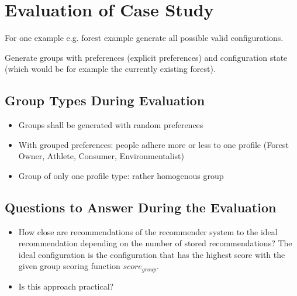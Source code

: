 \documentclass{article}
\begin{document}
    
\section{Evaluation of Case Study}

For one example e.g. forest example generate all possible valid configurations.

Generate groups with preferences (explicit preferences) and configuration state (which would be for example the currently existing forest).

\subsection{Group Types During Evaluation}
\begin{itemize}
    \item Groups shall be generated with random preferences
    \item With grouped preferences: people adhere more or less to one profile (Forest Owner, Athlete, Consumer, Environmentalist)
    \item Group of only one profile type: rather homogenous group
\end{itemize}

\subsection{Questions to Answer During the Evaluation}

\begin{itemize}
    \item How close are recommendations of the recommender system to the ideal recommendation depending on the number of stored recommendations? The ideal configuration is the configuration that has the highest score with the given group scoring function $score_{group}$.
    \item Is this approach practical?
\end{itemize}
\end{document}
